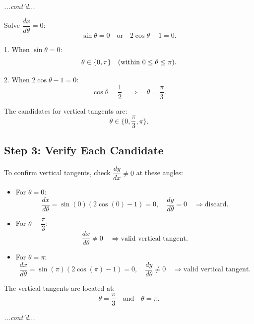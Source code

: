 \documentclass{article}
\begin{document}
\begin{examplebox}
    \textit{...cont'd...}
    \begin{solutionbox}
        Solve \( \dfrac{dx}{d\theta} = 0 \):
        \[
            \sin\theta = 0 \quad \text{or} \quad 2\cos\theta - 1 = 0.
        \]
        
        1. When \( \sin\theta = 0 \):
           \[
               \theta \in \{ 0, \pi \} \quad \text{(within \( 0 \leq \theta \leq \pi \))}.
           \]
        
        2. When \( 2\cos\theta - 1 = 0 \):
           \[
               \cos\theta = \dfrac{1}{2} \quad \Rightarrow \quad \theta = \dfrac{\pi}{3}.
           \]
        
        The candidates for vertical tangents are:
        \[
            \theta \in \{ 0, \dfrac{\pi}{3}, \pi \}.
        \]
        
        \subsection*{Step 3: Verify Each Candidate}
        To confirm vertical tangents, check \( \dfrac{dy}{dx} \neq 0 \) at these angles:
        \begin{itemize}
            \item For \( \theta = 0 \):
            \[
                \dfrac{dx}{d\theta} = \sin(0)(2\cos(0) - 1) = 0, \quad 
                \dfrac{dy}{d\theta} = 0 \quad \Rightarrow \text{discard}.
            \]
            \item For \( \theta = \dfrac{\pi}{3} \):
            \[
                \dfrac{dx}{d\theta} \neq 0 \quad \Rightarrow \text{valid vertical tangent}.
            \]
            \item For \( \theta = \pi \):
            \[
                \dfrac{dx}{d\theta} = \sin(\pi)(2\cos(\pi) - 1) = 0, \quad 
                \dfrac{dy}{d\theta} \neq 0 \quad \Rightarrow \text{valid vertical tangent}.
            \]
        \end{itemize}
        
        \begin{answerbox}
        The vertical tangents are located at:
        \[
            \theta = \dfrac{\pi}{3} \quad \text{and} \quad \theta = \pi.
        \]
        \end{answerbox}
    \end{solutionbox}
    \textit{...cont'd...}
\end{examplebox}
\end{document}
